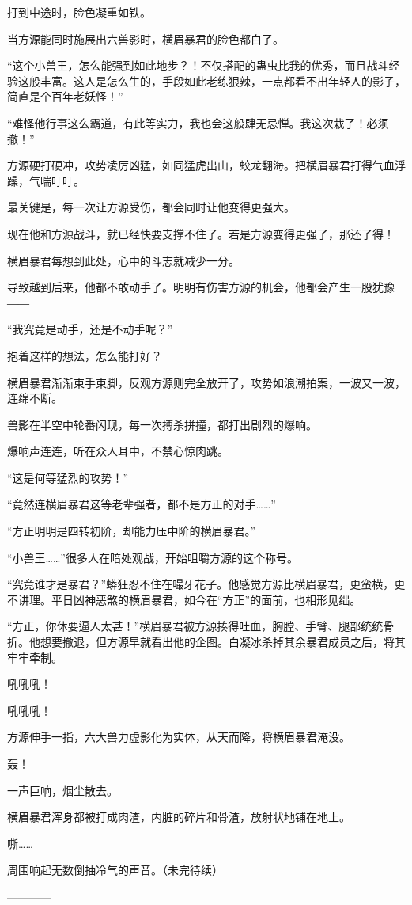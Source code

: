 \begin{this_body}
打到中途时，脸色凝重如铁。

当方源能同时施展出六兽影时，横眉暴君的脸色都白了。

“这个小兽王，怎么能强到如此地步？！不仅搭配的蛊虫比我的优秀，而且战斗经验这般丰富。这人是怎么生的，手段如此老练狠辣，一点都看不出年轻人的影子，简直是个百年老妖怪！”

“难怪他行事这么霸道，有此等实力，我也会这般肆无忌惮。我这次栽了！必须撤！”

方源硬打硬冲，攻势凌厉凶猛，如同猛虎出山，蛟龙翻海。把横眉暴君打得气血浮躁，气喘吁吁。

最关键是，每一次让方源受伤，都会同时让他变得更强大。

现在他和方源战斗，就已经快要支撑不住了。若是方源变得更强了，那还了得！

横眉暴君每想到此处，心中的斗志就减少一分。

导致越到后来，他都不敢动手了。明明有伤害方源的机会，他都会产生一股犹豫――

“我究竟是动手，还是不动手呢？”

抱着这样的想法，怎么能打好？

横眉暴君渐渐束手束脚，反观方源则完全放开了，攻势如浪潮拍案，一波又一波，连绵不断。

兽影在半空中轮番闪现，每一次搏杀拼撞，都打出剧烈的爆响。

爆响声连连，听在众人耳中，不禁心惊肉跳。

“这是何等猛烈的攻势！”

“竟然连横眉暴君这等老辈强者，都不是方正的对手……”

“方正明明是四转初阶，却能力压中阶的横眉暴君。”

“小兽王……”很多人在暗处观战，开始咀嚼方源的这个称号。

“究竟谁才是暴君？”蟒狂忍不住在嘬牙花子。他感觉方源比横眉暴君，更蛮横，更不讲理。平日凶神恶煞的横眉暴君，如今在“方正”的面前，也相形见绌。

“方正，你休要逼人太甚！”横眉暴君被方源揍得吐血，胸膛、手臂、腿部统统骨折。他想要撤退，但方源早就看出他的企图。白凝冰杀掉其余暴君成员之后，将其牢牢牵制。

吼吼吼！

吼吼吼！

方源伸手一指，六大兽力虚影化为实体，从天而降，将横眉暴君淹没。

轰！

一声巨响，烟尘散去。

横眉暴君浑身都被打成肉渣，内脏的碎片和骨渣，放射状地铺在地上。

嘶……

周围响起无数倒抽冷气的声音。（未完待续）

------------

\end{this_body}

